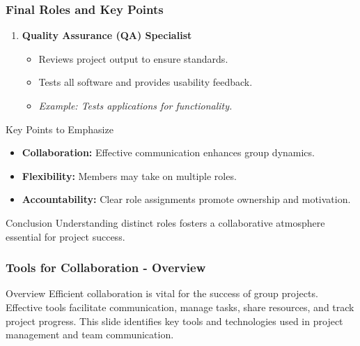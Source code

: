 \documentclass[aspectratio=169]{beamer}
\begin{document}
\begin{frame}[fragile]
    \frametitle{Final Roles and Key Points}
    \begin{enumerate}[resume]
        \item \textbf{Quality Assurance (QA) Specialist}
            \begin{itemize}
                \item Reviews project output to ensure standards.
                \item Tests all software and provides usability feedback.
                \item \textit{Example: Tests applications for functionality.}
            \end{itemize}
    \end{enumerate}
    
    \begin{block}{Key Points to Emphasize}
        \begin{itemize}
            \item \textbf{Collaboration:} Effective communication enhances group dynamics.
            \item \textbf{Flexibility:} Members may take on multiple roles.
            \item \textbf{Accountability:} Clear role assignments promote ownership and motivation.
        \end{itemize}
    \end{block}
    
    \begin{block}{Conclusion}
        Understanding distinct roles fosters a collaborative atmosphere essential for project success.
    \end{block}
\end{frame}

\begin{frame}[fragile]
    \frametitle{Tools for Collaboration - Overview}
    \begin{block}{Overview}
        Efficient collaboration is vital for the success of group projects. Effective tools facilitate communication, manage tasks, share resources, and track project progress. This slide identifies key tools and technologies used in project management and team communication.
    \end{block}
\end{frame}
\end{document}
